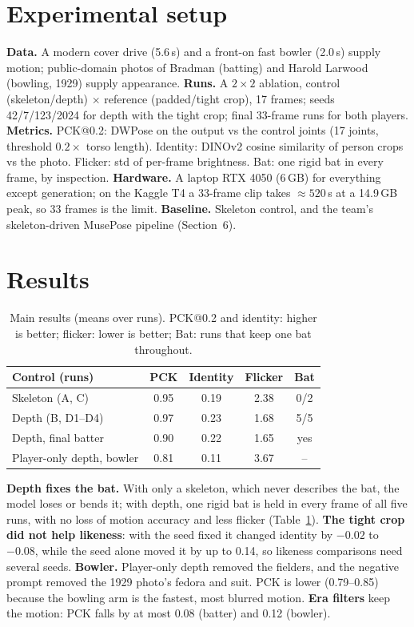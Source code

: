 \documentclass[11pt,a4paper,twocolumn]{article}
\begin{document}
\section{Experimental setup}
\textbf{Data.} A modern cover drive (5.6\,s) and a front-on fast bowler (2.0\,s) supply motion; public-domain photos of
Bradman (batting) and Harold Larwood (bowling, 1929) supply appearance.
\textbf{Runs.} A $2{\times}2$ ablation, control (skeleton/depth) $\times$ reference (padded/tight crop), 17 frames;
seeds 42/7/123/2024 for depth with the tight crop; final 33-frame runs for both players.
\textbf{Metrics.} PCK@0.2: DWPose on the output vs the control joints (17 joints, threshold $0.2\times$ torso length).
Identity: DINOv2 cosine similarity of person crops vs the photo. Flicker: std of per-frame brightness. Bat: one rigid
bat in every frame, by inspection.
\textbf{Hardware.} A laptop RTX 4050 (6\,GB) for everything except generation; on the Kaggle T4 a 33-frame clip takes
${\approx}520$\,s at a 14.9\,GB peak, so 33 frames is the limit.
\textbf{Baseline.} Skeleton control, and the team's skeleton-driven MusePose pipeline (Section~6).

\section{Results}
\begin{table}[h]
\centering
\small
\setlength{\tabcolsep}{3pt}
\begin{tabular}{lcccc}
\toprule
Control (runs) & PCK & Identity & Flicker & Bat\\
\midrule
Skeleton (A, C) & 0.95 & 0.19 & 2.38 & 0/2\\
Depth (B, D1--D4) & 0.97 & 0.23 & 1.68 & 5/5\\
\midrule
Depth, final batter & 0.90 & 0.22 & 1.65 & yes\\
Player-only depth, bowler & 0.81 & 0.11 & 3.67 & --\\
\bottomrule
\end{tabular}
\caption{Main results (means over runs). PCK@0.2 and identity: higher is better; flicker: lower is better; Bat: runs
that keep one bat throughout.}
\label{tab:results}
\end{table}
\textbf{Depth fixes the bat.} With only a skeleton, which never describes the bat, the model loses or bends it; with
depth, one rigid bat is held in every frame of all five runs, with no loss of motion accuracy and less flicker
(Table~\ref{tab:results}). \textbf{The tight crop did not help likeness}: with the seed fixed it changed identity by
$-0.02$ to $-0.08$, while the seed alone moved it by up to 0.14, so likeness comparisons need several seeds.
\textbf{Bowler.} Player-only depth removed the fielders, and the negative prompt removed the 1929 photo's fedora and
suit. PCK is lower (0.79--0.85) because the bowling arm is the fastest, most blurred motion.
\textbf{Era filters} keep the motion: PCK falls by at most 0.08 (batter) and 0.12 (bowler).
\end{document}
